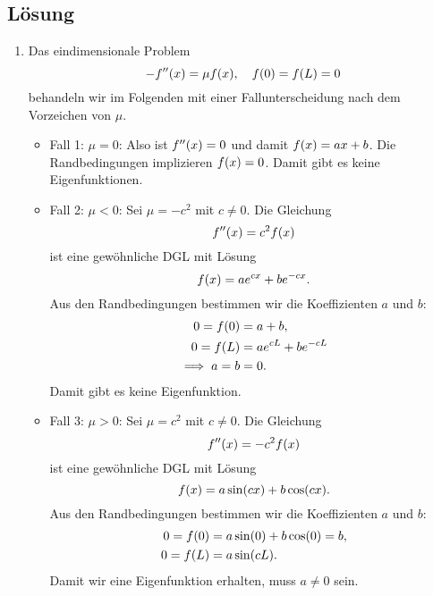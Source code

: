 \documentclass{exercise}
\begin{document}
    \subsection*{Lösung}
    \begin{enumerate}
        \item Das eindimensionale Problem
        \[
            -f''\parentheses*{x} = \mu f\parentheses*{x}, \quad f\parentheses*{0} = f\parentheses*{L} = 0
        \]
        behandeln wir im Folgenden mit einer Fallunterscheidung nach dem Vorzeichen von \(\mu\).
        \begin{itemize}
            \item Fall 1: \(\mu = 0\): Also ist \(f''\parentheses*{x} = 0\) und damit \(f\parentheses*{x} = ax + b\).
            Die Randbedingungen implizieren \(f\parentheses*{x} = 0\).
            Damit gibt es keine Eigenfunktionen.
            \item Fall 2: \(\mu < 0\): Sei \(\mu = -c^2\) mit \(c \ne 0\).
            Die Gleichung
            \[
                f''\parentheses*{x} = c^2 f\parentheses*{x}
            \]
            ist eine gewöhnliche DGL mit Lösung
            \[
                f\parentheses*{x} = ae^{cx} + be^{-cx}.
            \]
            Aus den Randbedingungen bestimmen wir die Koeffizienten \(a\) und \(b\):
            \begin{align*}
                0 = f\parentheses*{0} &= a + b,\\
                0 = f\parentheses*{L} &= ae^{cL} + be^{-cL}\\
                \implies a = b &= 0.
            \end{align*}
            Damit gibt es keine Eigenfunktion.
            \item Fall 3: \(\mu > 0\): Sei \(\mu = c^2\) mit \(c \ne 0\).
            Die Gleichung
            \[
                f''\parentheses*{x} = -c^2 f\parentheses*{x}
            \]
            ist eine gewöhnliche DGL mit Lösung
            \[
                f\parentheses*{x} = a\sin\parentheses*{cx} + b\cos\parentheses*{cx}.
            \]
            Aus den Randbedingungen bestimmen wir die Koeffizienten \(a\) und \(b\):
            \begin{align*}
                0 = f\parentheses*{0} &= a\sin\parentheses*{0} + b\cos\parentheses*{0} = b,\\
                0 = f\parentheses*{L} &= a\sin\parentheses*{cL}.
            \end{align*}
            Damit wir eine Eigenfunktion erhalten, muss \(a \ne 0\) sein.

\end{itemize}
\end{enumerate}
\end{document}
